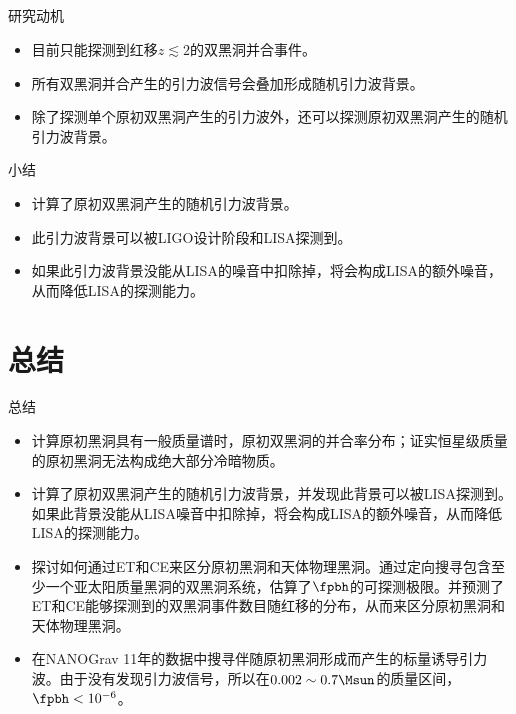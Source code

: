 \documentclass[xcolor={svgnames},compress]{beamer}
\let\olditem\item
\renewcommand{\item}{%
    \olditem\vspace{\fill}}
\begin{document}
\subsection{}
\begin{frame}{研究动机}
    \begin{itemize}
        \item \lvc 目前只能探测到红移$z\lesssim 2$的双黑洞并合事件。
        \item 所有双黑洞并合产生的引力波信号会叠加形成随机引力波背景。
        \item 除了探测单个原初双黑洞产生的引力波外，还可以探测原初双黑洞产生的随机引力波背景。
    \end{itemize}
\end{frame}


\begin{frame}{小结}	
    \begin{itemize}        
        \item 计算了原初双黑洞产生的随机引力波背景。
        \item 此引力波背景可以被LIGO设计阶段和LISA探测到。
        \item 如果此引力波背景没能从LISA的噪音中扣除掉，将会构成LISA的额外噪音，从而降低LISA的探测能力。
    \end{itemize}
\end{frame}

\section{总结}
\begin{frame}{总结}
    \begin{itemize}
        \item 计算原初黑洞具有一般质量谱时，原初双黑洞的并合率分布；证实恒星级质量的原初黑洞无法构成绝大部分冷暗物质。
        
        \item 计算了原初双黑洞产生的随机引力波背景，并发现此背景可以被LISA探测到。如果此背景没能从LISA噪音中扣除掉，将会构成LISA的额外噪音，从而降低LISA的探测能力。
        
        \item 探讨如何通过ET和CE来区分原初黑洞和天体物理黑洞。通过定向搜寻包含至少一个亚太阳质量黑洞的双黑洞系统，估算了$\fpbh$的可探测极限。并预测了ET和CE能够探测到的双黑洞事件数目随红移的分布，从而来区分原初黑洞和天体物理黑洞。
        
        \item 在NANOGrav 11年的数据中搜寻伴随原初黑洞形成而产生的标量诱导引力波。由于没有发现引力波信号，所以在$0.002\sim 0.7\Msun$的质量区间，$\fpbh < 10^{-6}$。
    \end{itemize}  
\end{frame}
\end{document}
